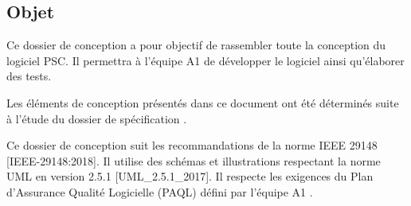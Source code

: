 \subsection{Objet}

Ce dossier de conception a pour objectif de rassembler toute la conception du logiciel PSC. 
Il permettra à l’équipe A1 de développer le logiciel ainsi qu’élaborer des tests.

Les éléments de conception présentés dans ce document ont été déterminés suite à l’étude du dossier de spécification .

Ce dossier de conception suit les recommandations de la norme IEEE 29148 [IEEE-29148:2018]. 
Il utilise des schémas et illustrations respectant la norme UML en version 2.5.1 [UML\_2.5.1\_2017].
Il respecte les exigences du Plan d’Assurance Qualité Logicielle (PAQL) défini par l’équipe A1 .
